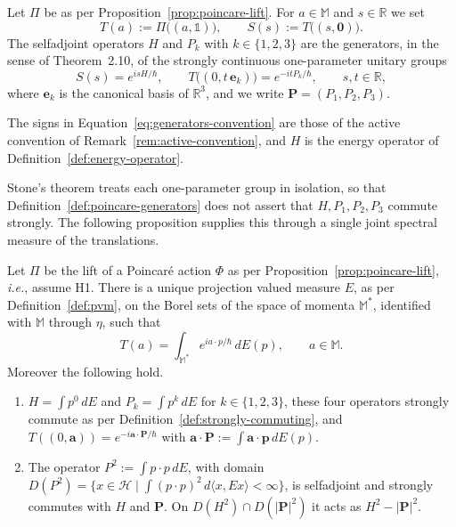 \begin{definition}\label{def:poincare-generators}
	Let $\Pi$ be as per Proposition~\ref{prop:poincare-lift}. For $a\in\mathbb{M}$ and $s\in\mathbb{R}$ we set
	\begin{equation*}
		T(a):=\Pi\big((a,\mathbb{1})\big), \qquad S(s):=T\big((s,\mathbf{0})\big).
	\end{equation*}
	The selfadjoint operators $H$ and $P_k$ with $k\in\{1,2,3\}$ are the generators, in the sense of Theorem~2.10, of the strongly continuous one-parameter unitary groups
	\begin{equation}\label{eq:generators-convention}
		S(s)=e^{isH/\hbar}, \qquad T\big((0,t\,\mathbf{e}_k)\big)=e^{-itP_k/\hbar}, \qquad s,t\in\mathbb{R},
	\end{equation}
	where $\mathbf{e}_k$ is the canonical basis of $\mathbb{R}^3$, and we write $\mathbf{P}=(P_1,P_2,P_3)$.
\end{definition}

\noindent The signs in Equation~\eqref{eq:generators-convention} are those of the active convention of Remark~\ref{rem:active-convention}, and $H$ is the energy operator of Definition~\ref{def:energy-operator}.

Stone's theorem treats each one-parameter group in isolation, so that Definition~\ref{def:poincare-generators} does not assert that $H,P_1,P_2,P_3$ commute strongly. The following proposition supplies this through a single joint spectral measure of the translations.

\begin{proposition}\label{prop:snag-translations}
	Let $\Pi$ be the lift of a Poincar\'e action $\Phi$ as per Proposition~\ref{prop:poincare-lift}, \textit{i.e.}, assume H1. There is a unique projection valued measure $E$, as per Definition~\ref{def:pvm}, on the Borel sets of the space of momenta $\mathbb{M}^*$, identified with $\mathbb{M}$ through $\eta$, such that
	\begin{equation}\label{eq:translation-spectral}
		T(a)=\int_{\mathbb{M}^*}e^{ia\cdot p/\hbar}\,dE(p), \qquad a\in\mathbb{M}.
	\end{equation}
	Moreover the following hold.
	\begin{enumerate}
		\item $H=\int p^0\,dE$ and $P_k=\int p^k\,dE$ for $k\in\{1,2,3\}$, these four operators strongly commute as per Definition~\ref{def:strongly-commuting}, and $T((0,\mathbf{a}))=e^{-i\mathbf{a}\cdot\mathbf{P}/\hbar}$ with $\mathbf{a}\cdot\mathbf{P}:=\int\mathbf{a}\cdot\mathbf{p}\,dE(p)$.
		\item The operator $P^2:=\int p\cdot p\,dE$, with domain $D(P^2)=\{x\in\mathcal{H}\mid\int(p\cdot p)^2\,d\langle x,Ex\rangle<\infty\}$, is selfadjoint and strongly commutes with $H$ and $\mathbf{P}$. On $D(H^2)\cap D(|\mathbf{P}|^2)$ it acts as $H^2-|\mathbf{P}|^2$.
	\end{enumerate}
\end{proposition}

